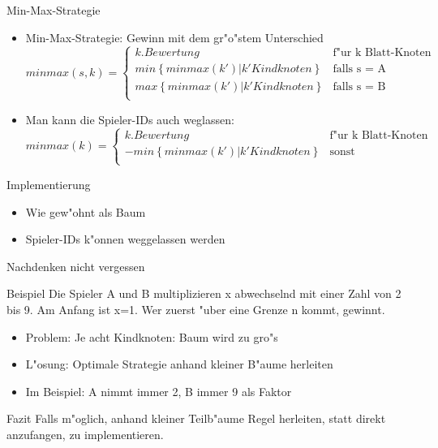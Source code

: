 \documentclass[18pt]{beamer}
\begin{document}
\begin{frame}{Min-Max-Strategie}
\begin{itemize}
\item Min-Max-Strategie: Gewinn mit dem gr"o"stem Unterschied
\begin{equation}
   minmax(s,k) =
   \begin{cases}
     k.Bewertung & \text{f"ur k Blatt-Knoten} \\
     min\left\{minmax(k') | k' Kindknoten\right\} & \text{falls s = A} \\
     max\left\{minmax(k') | k' Kindknoten\right\} & \text{falls s = B} \\
   \end{cases}
\end{equation}
\item Man kann die Spieler-IDs auch weglassen:
\begin{equation}
   minmax(k) =
   \begin{cases}
     k.Bewertung & \text{f"ur k Blatt-Knoten} \\
     - min\left\{minmax(k') | k' Kindknoten\right\} & \text{sonst} \\
   \end{cases}
\end{equation}
\end{itemize}
\end{frame}

\begin{frame}{Implementierung}
\begin{itemize}
\item Wie gew"ohnt als Baum

\item Spieler-IDs k"onnen weggelassen werden

\end{itemize}
\end{frame}

\begin{frame}{Nachdenken nicht vergessen}
\begin{block}{Beispiel}
Die Spieler A und B multiplizieren x abwechselnd mit einer Zahl von 2 bis 9. Am Anfang ist x=1. Wer zuerst "uber eine Grenze n kommt, gewinnt.
\end{block}
\pause
\begin{itemize}
\item Problem: Je acht Kindknoten: Baum wird zu gro"s
\item L"osung: Optimale Strategie anhand kleiner B"aume herleiten
\item Im Beispiel: A nimmt immer 2, B immer 9 als Faktor
\end{itemize}
\pause
\begin{block}{Fazit}
Falls m"oglich, anhand kleiner Teilb"aume Regel herleiten, statt direkt anzufangen, zu implementieren.
\end{block}
\end{frame}
\end{document}
